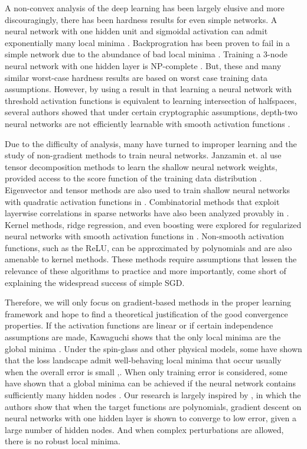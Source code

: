 \documentclass{article}
\begin{document}
A non-convex analysis of the deep learning has been largely elusive and more discouragingly, there has been hardness results for even simple networks. A neural network with one hidden unit and sigmoidal activation can admit exponentially many local minima \cite{Auer}. Backprogration has been proven to fail in a simple network due to the abundance of bad local minima \cite{brady1989back}. Training a 3-node neural network with one hidden layer is { NP}-complete \cite{BlumR88}.  But, these and many similar worst-case hardness results are based on worst case training data assumptions. However, by using a result in \cite{klivans2006cryptographic} that learning a neural network with threshold activation functions is equivalent to learning intersection of halfspaces, several authors showed that under certain cryptographic assumptions, depth-two neural networks are not efficiently learnable with smooth activation functions \cite{LivniSS14} \cite{ZhangLWJ15}\cite{ZhangLJ15}. 

Due to the difficulty of analysis, many have turned to improper learning and the study of non-gradient methods to train neural networks. Janzamin et. al use tensor decomposition methods to learn the shallow neural network weights, provided access to the score function of the training data distribution \cite{JanzaminSA15}. Eigenvector and tensor methods are also used to train shallow neural networks with quadratic activation functions in \cite{LivniSS14}. Combinatorial methods that exploit layerwise correlations in sparse networks have also been analyzed provably in \cite{AroraBGM13}. Kernel methods, ridge regression, and even boosting were explored for regularized neural networks with smooth activation functions in \cite{shalev2011learning}\cite{ZhangLWJ15}\cite{ZhangLJ15}. Non-smooth activation functions, such as the ReLU, can be approximated by polynomials and are also amenable to kernel methods\cite{GoelKKT16}. These methods require assumptions that lessen the relevance of these algorithms to practice and more importantly, come short of explaining the widespread success of simple SGD.

Therefore, we will only focus on gradient-based methods in the proper
learning framework and hope to find a theoretical justification of the
good convergence properties. If the activation functions are linear or
if certain independence assumptions are made, Kawaguchi shows that the
only local minima are the global minima \cite{Kawaguchi16a}. Under the
spin-glass and other physical models, some have shown that the loss
landscape admit well-behaving local minima that occur usually when the
overall error is small
\cite{ChoromanskaHMAL14},\cite{DauphinPGCGB14}. When only training
error is considered, some have shown that a global minima can be
achieved if the neural network contains sufficiently many hidden nodes
\cite{SoudryC16}. Our research is largely inspired by
\cite{valiant2014learning}, in which the authors show that when the
target functions are polynomials, gradient descent on neural networks
with one hidden layer is shown to converge to low error, given a large
number of hidden nodes. And when complex perturbations are allowed,
there is no robust local minima.
\end{document}
